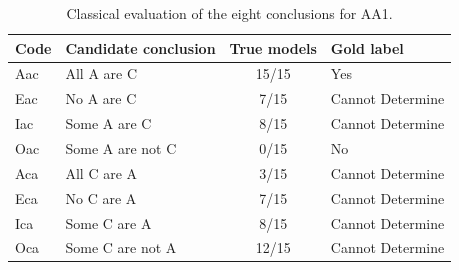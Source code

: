 \begin{table}[htbp]
\centering
\caption{Classical evaluation of the eight conclusions for AA1.}
\label{tab:aa1-classical}
\begin{tabular}{llcl}
\toprule
Code & Candidate conclusion & True models & Gold label \\
\midrule
Aac & All A are C & 15/15 & Yes \\
Eac & No A are C & 7/15 & Cannot Determine \\
Iac & Some A are C & 8/15 & Cannot Determine \\
Oac & Some A are not C & 0/15 & No \\
Aca & All C are A & 3/15 & Cannot Determine \\
Eca & No C are A & 7/15 & Cannot Determine \\
Ica & Some C are A & 8/15 & Cannot Determine \\
Oca & Some C are not A & 12/15 & Cannot Determine \\
\bottomrule
\end{tabular}
\end{table}
